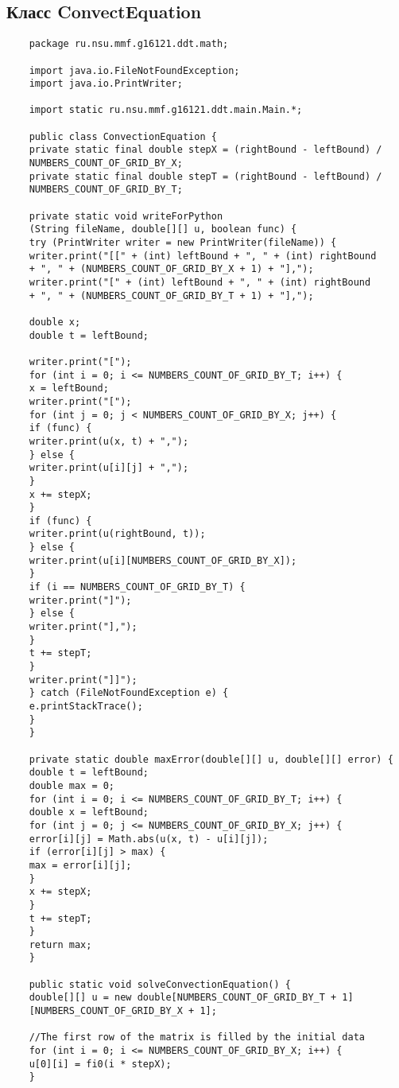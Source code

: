 \subsection{Класс ConvectEquation}

	\begin{verbatim}
	package ru.nsu.mmf.g16121.ddt.math;
	
	import java.io.FileNotFoundException;
	import java.io.PrintWriter;
	
	import static ru.nsu.mmf.g16121.ddt.main.Main.*;
	
	public class ConvectionEquation {
	private static final double stepX = (rightBound - leftBound) /
	NUMBERS_COUNT_OF_GRID_BY_X;
	private static final double stepT = (rightBound - leftBound) /
	NUMBERS_COUNT_OF_GRID_BY_T;
	
	private static void writeForPython
	(String fileName, double[][] u, boolean func) {
	try (PrintWriter writer = new PrintWriter(fileName)) {
	writer.print("[[" + (int) leftBound + ", " + (int) rightBound
	+ ", " + (NUMBERS_COUNT_OF_GRID_BY_X + 1) + "],");
	writer.print("[" + (int) leftBound + ", " + (int) rightBound
	+ ", " + (NUMBERS_COUNT_OF_GRID_BY_T + 1) + "],");
	
	double x;
	double t = leftBound;
	
	writer.print("[");
	for (int i = 0; i <= NUMBERS_COUNT_OF_GRID_BY_T; i++) {
	x = leftBound;
	writer.print("[");
	for (int j = 0; j < NUMBERS_COUNT_OF_GRID_BY_X; j++) {
	if (func) {
	writer.print(u(x, t) + ",");
	} else {
	writer.print(u[i][j] + ",");
	}
	x += stepX;
	}
	if (func) {
	writer.print(u(rightBound, t));
	} else {
	writer.print(u[i][NUMBERS_COUNT_OF_GRID_BY_X]);
	}
	if (i == NUMBERS_COUNT_OF_GRID_BY_T) {
	writer.print("]");
	} else {
	writer.print("],");
	}
	t += stepT;
	}
	writer.print("]]");
	} catch (FileNotFoundException e) {
	e.printStackTrace();
	}
	}
	
	private static double maxError(double[][] u, double[][] error) {
	double t = leftBound;
	double max = 0;
	for (int i = 0; i <= NUMBERS_COUNT_OF_GRID_BY_T; i++) {
	double x = leftBound;
	for (int j = 0; j <= NUMBERS_COUNT_OF_GRID_BY_X; j++) {
	error[i][j] = Math.abs(u(x, t) - u[i][j]);
	if (error[i][j] > max) {
	max = error[i][j];
	}
	x += stepX;
	}
	t += stepT;
	}
	return max;
	}
	
	public static void solveConvectionEquation() {
	double[][] u = new double[NUMBERS_COUNT_OF_GRID_BY_T + 1]
	[NUMBERS_COUNT_OF_GRID_BY_X + 1];
	
	//The first row of the matrix is filled by the initial data
	for (int i = 0; i <= NUMBERS_COUNT_OF_GRID_BY_X; i++) {
	u[0][i] = fi0(i * stepX);
	}
	

\end{verbatim}

